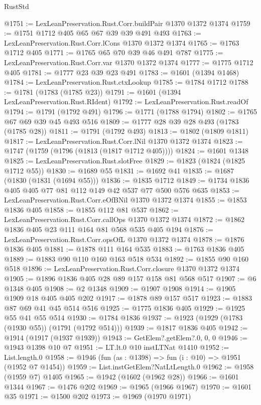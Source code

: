 \begin{lexlean}{RustStd}
\begin{coremodule}
@1751 := LexLeanPreservation.Rust.Corr.buildPair @1370 @1372 @1374
@1759 := @1751 @1712 @405 @65 @67 @39 @39 @491 @493
@1763 := LexLeanPreservation.Rust.Corr.lCons @1370 @1372 @1374
@1765 := @1763 @1712 @405
@1771 := @1765 @65 @70 @39 @46 @491 @787
@1775 := LexLeanPreservation.Rust.Corr.var @1370 @1372 @1374
@1777 := @1775 @1712 @405
@1781 := @1777 @23 @39 @23 @491
@1783 := @1601 (@1394 @1468)
@1784 := LexLeanPreservation.Rust.ctxLookup
@1785 := @1784 @1712
@1788 := @1781 (@1783 (@1785 @23))
@1791 := @1601 (@1394 LexLeanPreservation.Rust.RIdent)
@1792 := LexLeanPreservation.Rust.readOf
@1794 := @1791 (@1792 @491)
@1796 := @1771 (@1788 @1794)
@1802 := @1765 @67 @69 @39 @45 @493 @516
@1809 := @1777 @28 @39 @28 @493 (@1783 (@1785 @28))
@1811 := @1791 (@1792 @493)
@1813 := @1802 (@1809 @1811)
@1817 := LexLeanPreservation.Rust.Corr.lNil @1370 @1372 @1374
@1823 := @1747 (@1759 (@1796 (@1813 (@1817 @1712 @405))))
@1824 := @1601 @1348
@1825 := LexLeanPreservation.Rust.slotFree
@1829 := @1823 (@1824 (@1825 @1712 @55))
@1830 := @1689 @55
@1831 := @1692 @41
@1835 := @1687 (@1830 (@1831 (@1694 @55)))
@1836 := @1835 @1712
@1849 := @1734 @1836 @405 @405 @77 @81 @112 @149 @42 @537 @77 @500 @576 @635
@1853 := LexLeanPreservation.Rust.Corr.eOfBNil @1370 @1372 @1374
@1855 := @1853 @1836 @405
@1858 := @1855 @112 @81 @537
@1862 := LexLeanPreservation.Rust.Corr.callOps @1370 @1372 @1374
@1872 := @1862 @1836 @405 @23 @111 @164 @81 @568 @535 @405 @194
@1876 := LexLeanPreservation.Rust.Corr.opsOfL @1370 @1372 @1374
@1878 := @1876 @1836 @405
@1881 := @1878 @111 @164 @535
@1883 := @1763 @1836 @405
@1889 := @1883 @90 @110 @160 @163 @518 @534
@1892 := @1855 @90 @160 @518
@1896 := LexLeanPreservation.Rust.Corr.closure @1370 @1372 @1374
@1905 := @1896 @1836 @405 @28 @89 @157 @158 @81 @568 @517
@1907 := @6 @1348 @405
@1908 := @2 @1348
@1909 := @1907 @1908
@1914 := @1905 @1909 @18 @405 @405 @202
@1917 := @1878 @89 @157 @517
@1923 := @1883 @87 @69 @41 @45 @514 @516
@1925 := @1775 @1836 @405
@1929 := @1925 @55 @41 @55 @514
@1930 := @1784 @1836
@1937 := @1923 (@1929 (@1783 (@1930 @55)) (@1791 (@1792 @514)))
@1939 := @1817 @1836 @405
@1942 := @1914 (@1917 (@1937 @1939))
@1943 := GetElem?.getElem?.{0, 0, 0}
@1946 := @1943 @1398 @10 @7
@1951 := LT.lt.{0} @10 instLTNat @1410
@1952 := List.length.{0}
@1958 := @1946 (fun (as : @1398) => fun (i : @10) => @1951 (@1952 @7 @1454))
@1959 := List.instGetElem?NatLtLength.{0}
@1962 := @1958 (@1959 @7) @1405
@1965 := @1942 (@1602 (@1962 @28))
@1966 := @1601 @1344
@1967 := @1476 @202
@1969 := @1965 (@1966 @1967)
@1970 := @1601 @35
@1971 := @1500 @202
@1973 := @1969 (@1970 @1971)

\end{coremodule}
\end{lexlean}
